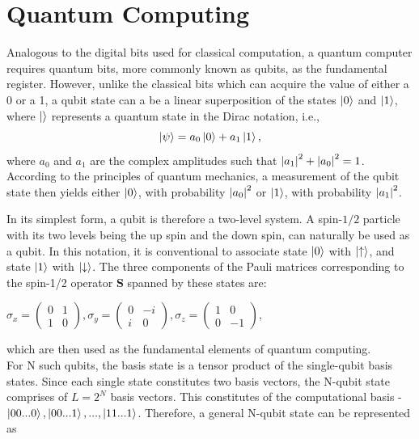 \documentclass[../main.tex]{subfiles}
\begin{document}
\section{Quantum Computing}
Analogous to the digital bits used for classical computation, a quantum computer requires quantum bits, more commonly known as qubits, as the fundamental register. However, unlike the classical bits which can acquire the value of either a 0 or a 1, a qubit state can a be a linear superposition of the states $\ket{0}$ and $\ket{1}$, where $\ket{}$ represents a quantum state in the Dirac notation, i.e.,
\begin{equation}
\ket{\psi}= a_0 \ket{0} + a_1 \ket{1},  \label{eq:b1}
\end{equation}
where $a_0$ and $a_1$ are the complex amplitudes such that ${\abs{a_1}}^2 +{\abs{a_0}}^2 =1$. According to the principles of quantum mechanics, a measurement of the qubit state then yields either $\ket{0}$, with probability ${\abs{a_0}}^2$ or $\ket{1}$, with probability ${\abs{a_1}}^2$. 

In its simplest form, a qubit is therefore a two-level system. A spin-$1/2$ particle with its two levels being the up spin and the down spin, can naturally be used as a qubit. In this notation, it is conventional to associate state $\ket{0}$ with $\ket{\uparrow}$, and state $\ket{1}$ with $\ket{\downarrow}$. The three components of the Pauli matrices corresponding to the spin-1/2 operator \textbf{S} spanned by these states are:
\begin{center}
$ \sigma_x= \begin{pmatrix}
0 & 1\\
1 & 0
\end{pmatrix}, \sigma_y= \begin{pmatrix}
0 & -i\\
i & 0
\end{pmatrix}, \sigma_z= \begin{pmatrix}
1 & 0\\
0 & -1
\end{pmatrix},
$\\
\end{center}
which are then used as the fundamental elements of quantum computing.\\

For N such qubits, the basis state is a tensor product of the single-qubit basis states. Since each single state constitutes two basis vectors, the N-qubit state comprises of $L=2^N$ basis vectors. This constitutes of the computational basis -
$\ket{00...0}, \ket{00...1},..., \ket{11...1}$. Therefore, a general N-qubit state  can be represented as
\end{document}
